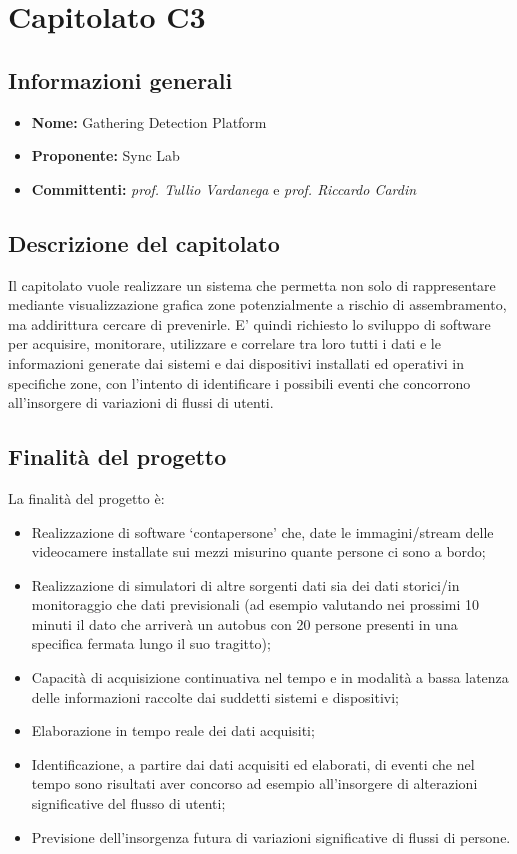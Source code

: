 \section{Capitolato C3}

\subsection{Informazioni generali}
\begin{itemize}
\item \textbf{Nome:}  Gathering Detection Platform 
\item \textbf{Proponente:} Sync Lab 
\item \textbf{Committenti:} \textit{prof. Tullio Vardanega} e \textit{prof. Riccardo Cardin}
\end{itemize}

\subsection{Descrizione del capitolato}
Il capitolato vuole realizzare un sistema che permetta non solo di rappresentare mediante visualizzazione grafica zone potenzialmente a rischio di assembramento, ma addirittura cercare di prevenirle. E' quindi richiesto lo sviluppo di software per acquisire, monitorare, utilizzare e correlare tra loro tutti i dati e le informazioni generate dai sistemi e dai dispositivi installati ed operativi in specifiche zone, con l'intento di identificare i possibili eventi che concorrono all'insorgere di variazioni di flussi di utenti. 
\subsection{Finalità del progetto}
La finalità del progetto è:
\begin{itemize}
\item Realizzazione di software ‘contapersone’ che, date le immagini/stream delle videocamere installate sui mezzi misurino quante persone ci sono a bordo;
\item Realizzazione di simulatori di altre sorgenti dati sia dei dati storici/in monitoraggio che dati previsionali
(ad esempio valutando nei prossimi 10 minuti il dato che arriverà un autobus con 20 persone presenti
in una specifica fermata lungo il suo tragitto);
\item Capacità di acquisizione continuativa nel tempo e in modalità a bassa latenza delle informazioni
raccolte dai suddetti sistemi e dispositivi;
\item Elaborazione in tempo reale dei dati acquisiti;
\item Identificazione, a partire dai dati acquisiti ed elaborati, di eventi che nel tempo sono risultati aver
concorso ad esempio all'insorgere di alterazioni significative del flusso di utenti;
\item Previsione dell'insorgenza futura di variazioni significative di flussi di persone.
\end{itemize}

